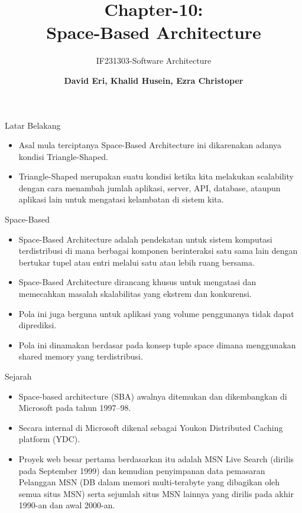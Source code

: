 \documentclass[aspectratio=169, table]{beamer}
\subtitle{IF231303-Software Architecture}
\title{\huge Chapter-10:\\Space-Based Architecture}
\author[Pradita]{\small {\textbf{David Eri, Khalid Husein, Ezra Christoper }}}
\begin{document}
	\begin{frame}[plain]
		\maketitle
	\end{frame}

	\begin{frame}{Latar Belakang}
		\begin{itemize}
			\item Asal mula terciptanya Space-Based Architecture ini dikarenakan adanya kondisi Triangle-Shaped.
			\item Triangle-Shaped merupakan suatu kondisi ketika kita melakukan scalability dengan cara menambah jumlah aplikasi, server, API, database, ataupun aplikasi lain untuk mengatasi kelambatan di sistem kita.
		\end{itemize}
	\end{frame}

	\begin{frame}{Space-Based}
		\begin{itemize}
			\item Space-Based Architecture adalah pendekatan untuk sistem komputasi terdistribusi di mana berbagai komponen berinteraksi satu sama lain dengan bertukar tupel atau entri melalui satu atau lebih ruang bersama.
			\item Space-Based Architecture dirancang khusus untuk mengatasi dan memecahkan masalah skalabilitas yang ekstrem dan konkurensi.
			\item Pola ini juga berguna untuk aplikasi yang volume penggunanya tidak dapat diprediksi.
			\item Pola ini dinamakan berdasar pada konsep tuple space dimana menggunakan shared memory yang terdistribusi.
		\end{itemize}
	\end{frame}



	\begin{frame}{Sejarah}
		\begin{itemize}
			\item Space-based architecture (SBA) awalnya ditemukan dan dikembangkan di Microsoft pada tahun 1997–98.
			\item Secara internal di Microsoft dikenal sebagai Youkon Distributed Caching platform (YDC).
			\item Proyek web besar pertama berdasarkan itu adalah MSN Live Search (dirilis pada September 1999) dan kemudian penyimpanan data pemasaran Pelanggan MSN (DB dalam memori multi-terabyte yang dibagikan oleh semua situs MSN) serta sejumlah situs MSN lainnya yang dirilis pada akhir 1990-an dan awal 2000-an.
		\end{itemize}
	\end{frame}
\end{document}
